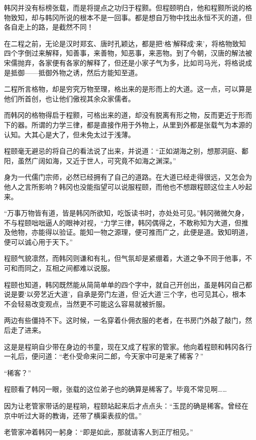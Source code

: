 韩冈并没有标榜张载，而是将提点之功归于程颢。但程颐明白，他和程颢所说的格物致知，却与韩冈所说的根本不是一回事。都是想自万物中找出永恒不灭的道，但各自走上的路，是截然不同！

在二程之前，无论是汉时郑玄、唐时孔颖达，都是把‘格’解释成‘来’，将格物致知四个字倒过来解释，知善事，来善物，知恶事，来恶物。到了今朝，汉唐的解法被宋儒抛弃，各家便有各家的解释了，但还是小家子气为多，比如司马光，将格说成是抵御——抵御外物之诱，然后方能知至道。

二程所言格物，却是穷究万物至理，格出来的是形而上的大道。这一点，可以算是他们所首创，也让他们傲视其余众家儒者。

而韩冈的格物得启于程颢，可格出来的道，却没有脱离有形之物，反而更近于形而下的器。所谓的力学三律，都是直接作用于外物上，从里到外都是张载气为本源的认知。大其心是大了，但未免太过于浅薄。

程颐毫无避忌的将自己的看法说了出来，并说道：“正如湖海之别，想那洞庭、鄱阳，虽然广阔如海，又近于世人，可究竟不如海之渊深。”

身为一代儒门宗师，必然已经拥有了自己的道路。在大道已经走得很远，又怎会为他人之言所影响？韩冈也没能指望可以说服程颐，而他也不想跟程颐这位主人吵起来。

“万事万物皆有道，皆是韩冈所欲知，吃饭读书时，亦处处可见。”韩冈微微欠身，不与程颐咄咄逼人的眼神对视，“力学三律，韩冈偶得之，不敢称知为大道，但推及他物，亦能得以验证。能知一物之源理，便可推而广之，此便是道。致知明道，便可以诚心用于天下。”

程颐气貌凛然，而韩冈则谦和有礼，但气氛却是紧绷着，大道之争不同于他事，不可和而同之，互相之间都难以说服。

程颐也知道，韩冈既然能从简简单单的四个字中，就自己开创出，虽是韩冈自己都说是要‘以旁艺近大道’，自承是旁门左道，但‘近大道’三个字，也可见其心，根本不会轻易改变观点，当然更不可能这么容易就被折服。

两边有些僵持不下。这时候，一名穿着仆佣衣服的老者，在书房门外敲了敲门，然后走了进来。

这是是程珦自少带在身边的书童，现在又成了程家的管家。他向着程颐和韩冈各行一礼后，便问道：“老仆受命来问二郎，今天家中可是来了稀客？”

“稀客？”

程颐看了韩冈一眼，张载的这位弟子也的确算是稀客了。毕竟不常见啊……

因为让老管家带话的是程珦，程颐站起来后才点点头：“玉昆的确是稀客。曾经在京中听过大哥的教诲，还带了横渠表叔的信。”

老管家冲着韩冈一躬身：“即是如此，那就请客人到正厅相见。”

